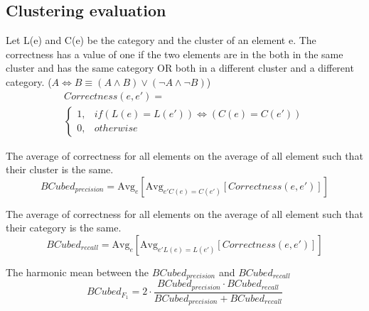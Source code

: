 \subsection{Clustering evaluation}

\begin{definition}
  Let L(e) and C(e) be the category and the cluster of an element e.
  The correctness has a value of one if the two elements are in the both in the same cluster and has the same category OR both in a different cluster and a different category. ($A \Longleftrightarrow B \equiv (A \land B) \lor (\neg A \land \neg B)$)
  \begin{gather*}
    Correctness(e, e') = \\
    \begin{cases}
      1, & if (L(e) = L(e')) \Longleftrightarrow (C(e) = C(e'))\\
      0, & otherwise
    \end{cases}
  \end{gather*}
\end{definition}

\begin{definition}
  The average of correctness for all elements on the average of all element such that their cluster is the same.
  \begin{equation}
    BCubed_{precision} = \text{Avg}_{e}[\text{Avg}_{e' C(e)=C(e')}[Correctness(e, e')]]
  \end{equation}
\end{definition}

\begin{definition}
  The average of correctness for all elements on the average of all element such that their category is the same.
  \begin{equation}
    BCubed_{recall} = \text{Avg}_{e}[\text{Avg}_{e' L(e)=L(e')}[Correctness(e, e')]]
  \end{equation}
\end{definition}

\begin{definition}
  The harmonic mean between the $BCubed_{precision}$ and $BCubed_{recall}$
  \begin{equation}
    BCubed_{F_1} =
    2 \cdot \frac{BCubed_{precision} \cdot BCubed_{recall}}
    {BCubed_{precision} + BCubed_{recall}}
  \end{equation}
\end{definition}

